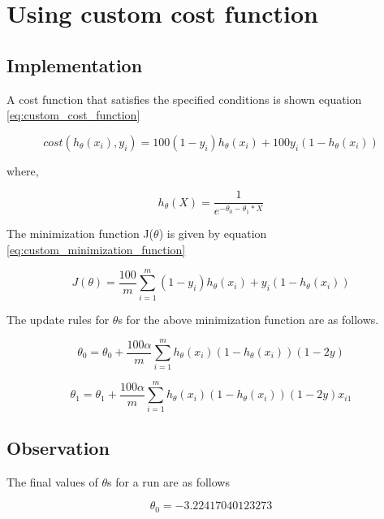 \section{Using custom cost function}

\subsection{Implementation}
A cost function that satisfies the specified conditions is shown equation \ref{eq:custom_cost_function}

\begin{equation}
\label{eq:custom_cost_function}
cost(h_{\theta}(x_i), y_i) = 100(1-y_i)h_{\theta}(x_i) + 100y_i(1-h_{\theta}(x_i))
\end{equation}

where,

\begin{equation}
\label{eq:logistic_regression}
h_{\theta}(X) = \frac{1}{e^{-\theta_0 - \theta_1 * X}}
\end{equation}

The minimization function J($\theta$) is given by equation \ref{eq:custom_minimization_function}

\begin{equation}
\label{eq:custom_minimization_function}
J(\theta) = \frac{100}{m} \sum_{i=1}^{m}(1-y_i)h_{\theta}(x_i) + y_i(1-h_{\theta}(x_i))
\end{equation}

The update rules for $\theta$s for the above minimization function are as follows.

\begin{equation}
\label{eq:theta_0_update}
\theta_0 = \theta_0 + \frac{100\alpha}{m}\sum_{i=1}^{m}h_\theta(x_i)(1-h_\theta(x_i))(1-2y)
\end{equation}

\begin{equation}
\label{eq:theta_1_update}
\theta_1 = \theta_1 + \frac{100\alpha}{m}\sum_{i=1}^{m}h_\theta(x_i)(1-h_\theta(x_i))(1-2y)x_{i1}
\end{equation}

\subsection{Observation}
The final values of $\theta$s for a run are as follows

\begin{equation}
\theta_0 = -3.22417040123273
\end{equation}

